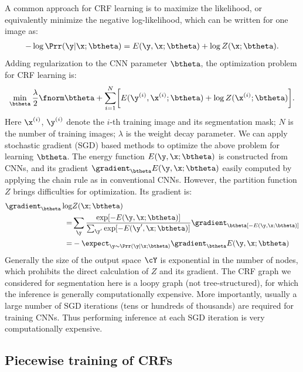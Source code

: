 A common approach for CRF learning is to maximize the likelihood,
or equivalently minimize the negative log-likelihood, which can be written
for one image as:
\begin{align}
 - \log \Prr(\y | \x; \btheta) = E(\y, \x; \btheta) + \log Z(\x; \btheta).
\label{eq:Prr}
\end{align}
Adding regularization to the CNN parameter $\btheta$, the optimization problem for CRF learning is: 
{\small
\begin{align}
\label{eq:crf_learning_org}
\min_{\btheta} \frac{\lambda}{2} \fnorm \btheta + \sum_{i=1}^N \biggr[ E(\y^{(i)}, \x^{(i)}; \btheta) + \log Z(\x^{(i)}; \btheta) \biggr].
\end{align}
}
%
%
%
%
Here $\x^{(i)}$, $\y^{(i)}$ denote the $i$-th training image and its segmentation mask; $N$ is the number of training images; $\lambda$ is the weight decay parameter.
%
%
%
%
%
%
%
We can apply stochastic gradient (SGD) based methods to optimize the above problem for learning $\btheta$.
The energy function $E (\y, \x; \btheta)$ is constructed from CNNs, and its
gradient $\gradient_\btheta E (\y, \x; \btheta)$ easily computed
by applying the chain rule as in conventional CNNs.
However, the partition function $Z$ brings difficulties for optimization.  Its gradient is:
\begin{align}
\gradient_\btheta  \log &  Z(\x ; \btheta)  \notag  \\
	 = &  \sum_\y \frac{\exp[-E(\y, \x; \btheta)]} {\sum_{\y'} \exp[-E(\y', \x; \btheta)]} \gradient_\btheta [ - E (\y, \x; \btheta)] \notag \\
	 = &  - \expect_{\y \sim \Prr(\y | \x ; \btheta)} \gradient_\btheta E (\y, \x; \btheta)
\end{align}
Generally the size of the output space $\cY$
is exponential in
the number of nodes, which prohibits the direct calculation of $Z$ and its gradient.
The CRF graph we considered for segmentation here is a loopy graph (not tree-structured),
for which the inference is generally computationally expensive.
More importantly, usually a large number of SGD iterations (tens or hundreds of thousands) are required for
training CNNs. Thus performing inference at each SGD iteration is very computationally expensive.




\subsection{Piecewise training of CRFs}


